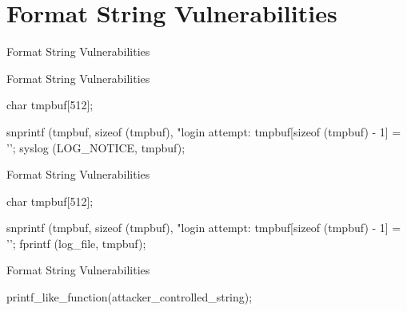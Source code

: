 \section{Format String Vulnerabilities}

\begin{slide}{Format String Vulnerabilities}{}
  \begin{nicscolumn}
  \end{nicscolumn}
\end{slide}

\begin{slide}{Format String Vulnerabilities}{}
  \begin{nicscolumn}
    \begin{nicsextern}{}
      char tmpbuf[512];

      snprintf (tmpbuf, sizeof (tmpbuf), "login attempt: %
      tmpbuf[sizeof (tmpbuf) - 1] = '\0';
      syslog (LOG_NOTICE, tmpbuf);
    \end{nicsextern}
  \end{nicscolumn}
\end{slide}

\begin{slide}{Format String Vulnerabilities}{}
  \begin{nicscolumn}
    \begin{nicsextern}{}
      char tmpbuf[512];

      snprintf (tmpbuf, sizeof (tmpbuf), "login attempt: %
      tmpbuf[sizeof (tmpbuf) - 1] = '\0';
      fprintf (log_file, tmpbuf);
    \end{nicsextern}
  \end{nicscolumn}
\end{slide}

\begin{slide}{Format String Vulnerabilities}{}
  \begin{nicscolumn}
    \nicsmedskip
    \begin{nicscode}
      printf_like_function(attacker_controlled_string);
    \end{nicscode}
  \end{nicscolumn}
\end{slide}

